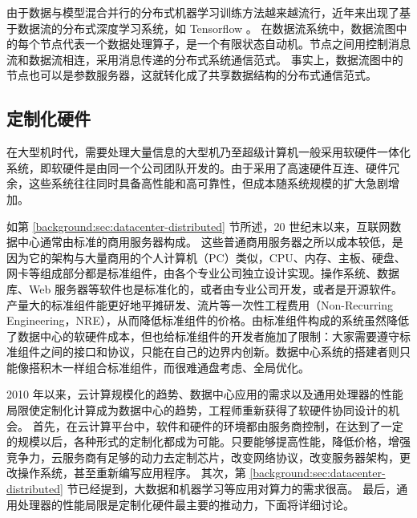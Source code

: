 由于数据与模型混合并行的分布式机器学习训练方法越来越流行，近年来出现了基于数据流的分布式深度学习系统，如 Tensorflow \cite{abadi2016tensorflow}。
在数据流系统中，数据流图中的每个节点代表一个数据处理算子，是一个有限状态自动机。节点之间用控制消息流和数据流相连，采用消息传递的分布式系统通信范式。
事实上，数据流图中的节点也可以是参数服务器，这就转化成了共享数据结构的分布式通信范式。






\subsection{定制化硬件}
\label{background:sec:datacenter-customized}


在大型机时代，需要处理大量信息的大型机乃至超级计算机一般采用软硬件一体化系统，即软硬件是由同一个公司团队开发的。由于采用了高速硬件互连、硬件冗余，这些系统往往同时具备高性能和高可靠性，但成本随系统规模的扩大急剧增加。

如第 \ref{background:sec:datacenter-distributed} 节所述，20 世纪末以来，互联网数据中心通常由标准的商用服务器构成。
这些普通商用服务器之所以成本较低，是因为它的架构与大量商用的个人计算机（PC）类似，CPU、内存、主板、硬盘、网卡等组成部分都是标准组件，由各个专业公司独立设计实现。操作系统、数据库、Web 服务器等软件也是标准化的，或者由专业公司开发，或者是开源软件。产量大的标准组件能更好地平摊研发、流片等一次性工程费用（Non-Recurring Engineering，NRE），从而降低标准组件的价格。由标准组件构成的系统虽然降低了数据中心的软硬件成本，但也给标准组件的开发者施加了限制：大家需要遵守标准组件之间的接口和协议，只能在自己的边界内创新。数据中心系统的搭建者则只能像搭积木一样组合标准组件，而很难通盘考虑、全局优化。

2010 年以来，云计算规模化的趋势、数据中心应用的需求以及通用处理器的性能局限使定制化计算成为数据中心的趋势，工程师重新获得了软硬件协同设计的机会。
首先，在云计算平台中，软件和硬件的环境都由服务商控制，在达到了一定的规模以后，各种形式的定制化都成为可能。只要能够提高性能，降低价格，增强竞争力，云服务商有足够的动力去定制芯片，改变网络协议，改变服务器架构，更改操作系统，甚至重新编写应用程序。
其次，第 \ref{background:sec:datacenter-distributed} 节已经提到，大数据和机器学习等应用对算力的需求很高。
最后，通用处理器的性能局限是定制化硬件最主要的推动力，下面将详细讨论。

